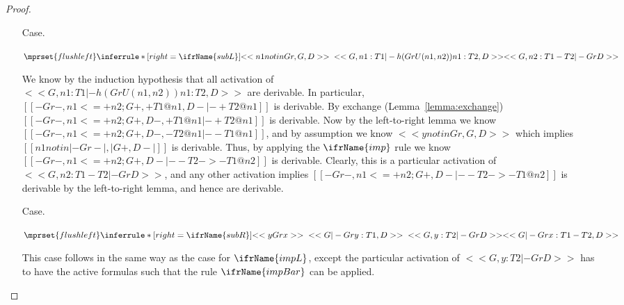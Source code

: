 \begin{proof}
\begin{itemize}
  \item[Case.]\ \\ 
    \begin{center}
      \begin{math}
        $$\mprset{flushleft}
        \inferrule* [right=\ifrName{subL}] {
          <<n1 notin Gr, G, D>>
          \\\\
          <<G, n1 : T1 |- h(Gr U {(n1,n2)}) n1 : T2, D>>
        }{<<G, n2 : T1 - T2 |- Gr D>>}
      \end{math}
    \end{center}
    We know by the induction hypothesis
    that all activation of \\ $<<G, n1 : T1 |- h(Gr U {(n1,n2)}) n1 : T2, D>>$ are derivable.  In particular,
    $[[-Gr-,n1 <=+ n2 ; {G}+, +{T1}@n1,{D}- |- +{T2}@n1]]$ is derivable.  By exchange (Lemma~\ref{lemma:exchange})
    $[[-Gr-,n1 <=+ n2 ; {G}+, {D}-,+{T1}@n1 |- +{T2}@n1]]$ is derivable.  Now by the left-to-right lemma we know 
    $[[-Gr-,n1 <=+ n2 ; {G}+, {D}-,-{T2}@n1 |- -{T1}@n1]]$, and by
    assumption we know $<<y notin Gr, G, D>>$ which implies \\
    $[[n1 notin |-Gr-|,|{G}+,{D}-|]]$ is derivable.  Thus, by applying the $\ifrName{imp}$ rule we know  
    $[[-Gr-,n1 <=+ n2 ; {G}+, {D}- |- - {T2} ->- {T1}@n2]]$ is derivable.  Clearly, this is a particular activation of
    $<<G, n2 : T1 - T2 |- Gr D>>$, and any other activation implies
    $[[-Gr-,n1 <=+ n2 ; {G}+, {D}- |- - {T2} ->- {T1}@n2]]$ is derivable by the left-to-right lemma, and hence are derivable.

  \item[Case.]\ \\ 
    \begin{center}
      \begin{math}
        $$\mprset{flushleft}
        \inferrule* [right=\ifrName{subR}] {
          <<y Gr x>>
          \\\\
          <<G |- Gr y : T1 , D>>
          \\\\
          <<G, y : T2 |- Gr D>>
        }{<<G |- Gr x : T1 - T2, D>>}
      \end{math}
    \end{center}
    This case follows in the same way as the case for $\ifrName{impL}$,
    except the particular activation of $<<G, y : T2 |- Gr D>>$ has to have the active formulas such that the
    rule $\ifrName{impBar}$ can be applied.
  \end{itemize}
\end{proof}

